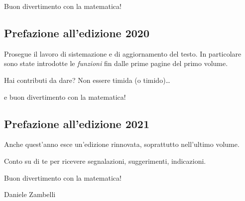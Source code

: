 Buon divertimento con la matematica!

\subsection*{Prefazione all'edizione 2020}
Prosegue il lavoro di sistemazione e di aggiornamento del testo.
In particolare sono state introdotte le \emph{funzioni} fin dalle prime 
pagine del primo volume.

Hai contributi da dare? Non essere timida (o timido)\dots

e buon divertimento con la matematica!

\subsection*{Prefazione all'edizione 2021}
Anche quest'anno esce un'edizione rinnovata, soprattutto nell'ultimo volume.

Conto su di te per ricevere segnalazioni, suggerimenti, indicazioni.

Buon divertimento con la matematica!
\begin{flushright}
Daniele Zambelli
\end{flushright}
